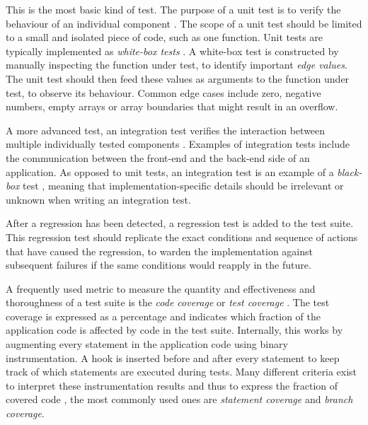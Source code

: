 \begin{enumerate}
	 This is the most basic kind of test. The purpose of a unit test is to verify the behaviour of an individual component \cite{whittaker2000}. The scope of a unit test should be limited to a small and isolated piece of code, such as one function. Unit tests are typically implemented as \emph{white-box tests} \cite[p.~12]{6588537}. A white-box test is constructed by manually inspecting the function under test, to identify important \emph{edge values}. The unit test should then feed these values as arguments to the function under test, to observe its behaviour. Common edge cases include zero, negative numbers, empty arrays or array boundaries that might result in an overflow.
	
	 A more advanced test, an integration test verifies the interaction between multiple individually tested components \cite{whittaker2000}. Examples of integration tests include the communication between the front-end and the back-end side of an application. As opposed to unit tests, an integration test is an example of a \emph{black-box} test \cite[p.~6]{6588537}, meaning that implementation-specific details should be irrelevant or unknown when writing an integration test.
	
	 After a regression has been detected, a regression test \cite[p.~372]{8016712} is added to the test suite. This regression test should replicate the exact conditions and sequence of actions that have caused the regression, to warden the implementation against subsequent failures if the same conditions would reapply in the future.
\end{enumerate}

\noindent A frequently used metric to measure the quantity and effectiveness and thoroughness of a test suite is the \emph{code coverage} or \emph{test coverage} \cite[p.~467]{8016712}. The test coverage is expressed as a percentage and indicates which fraction of the application code is affected by code in the test suite. Internally, this works by augmenting every statement in the application code using binary instrumentation. A hook is inserted before and after every statement to keep track of which statements are executed during tests. Many different criteria exist to interpret these instrumentation results and thus to express the fraction of covered code \cite{Myers:2011:AST:2161638}, the most commonly used ones are \emph{statement coverage} and \emph{branch coverage}.

